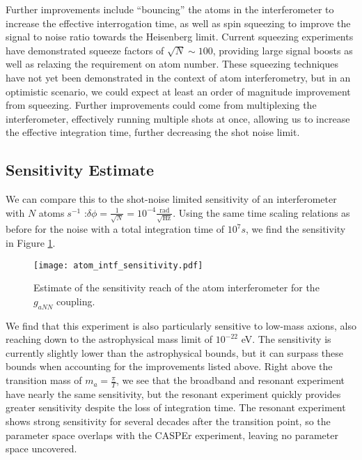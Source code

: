 \documentclass[aps,prd,final,letterpaper]{revtex4}
\begin{document}


Further improvements include ``bouncing'' the atoms in the interferometer to increase the effective interrogation time, as well as spin squeezing to improve the signal to noise ratio towards the Heisenberg limit. Current squeezing experiments have demonstrated squeeze factors of $\sqrt{N} \sim 100$, providing large signal boosts as well as relaxing the requirement on atom number. These squeezing techniques have not yet been demonstrated in the context of atom interferometry, but in an optimistic scenario, we could expect at least an order of magnitude improvement from squeezing. Further improvements could come from multiplexing the interferometer, effectively running multiple shots at once, allowing us to increase the effective integration time, further decreasing the shot noise limit.

\subsection{Sensitivity Estimate}

We can compare this to the shot-noise limited sensitivity of an interferometer with $N$ atoms$\;s^{-1}$ :$\delta{\phi} = \frac{1}{\sqrt{N}} = 10^{-4} \frac{\mathrm{rad}}{\sqrt{\mathrm{Hz}}}$. Using the same time scaling relations as before for the noise with a total integration time of $10^7 s$, we find the sensitivity in Figure \ref{atom_int_sens_est}. 

\begin{figure}
\texttt{[image: atom\_intf\_sensitivity.pdf]}
\caption{Estimate of the sensitivity reach of the atom interferometer for the $g_{aNN}$ coupling.}
\label{atom_int_sens_est}
\end{figure}

We find that this experiment is also particularly sensitive to low-mass axions, also reaching down to the astrophysical mass limit of $10^{-22}$ eV. The sensitivity is currently slightly lower than the astrophysical bounds, but it can surpass these bounds when accounting for the improvements listed above. Right above the transition mass of $m_a = \frac{\pi}{T}$, we see that the broadband and resonant experiment have nearly the same sensitivity, but the resonant experiment quickly provides greater sensitivity despite the loss of integration time. The resonant experiment shows strong sensitivity for several decades after the transition point, so the parameter space overlaps with the CASPEr experiment, leaving no parameter space uncovered.
\end{document}
